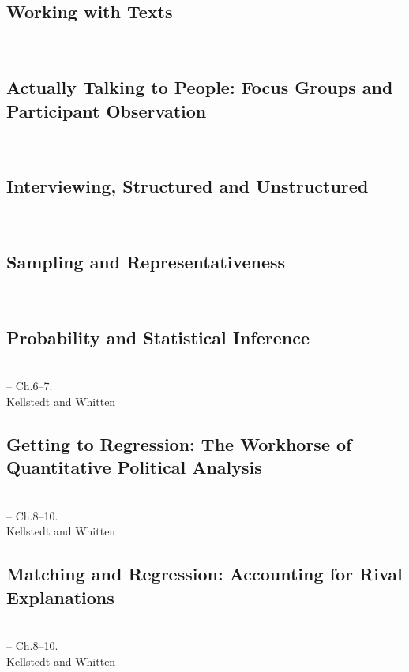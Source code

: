 \documentclass[12pt,a4paper]{article}
\newcommand{\lecture}[3][\DefaultOpt]{%
  \def\DefaultOpt{#2}%
  \clearpage\subsection[#1]{#2}\emph{#3}\vspace{.25em}\\
}
\newcommand{\reading}[2][]{\noindent -- {#1}\bibentry{#2}.\vspace{.25em}\\}
\newcommand{\textbook}[2][]{\noindent -- {#1}#2.\vspace{.25em}\\}
\begin{document}

\lecture{Working with Texts}{}

\lecture{Actually Talking to People: Focus Groups and Participant Observation}{}


\lecture{Interviewing, Structured and Unstructured}{}

\lecture{Sampling and Representativeness}{}

\lecture{Probability and Statistical Inference}{}
\textbook{Ch.6--7}{Kellstedt and Whitten}

\lecture{Getting to Regression: The Workhorse of Quantitative Political Analysis}{} 
\textbook{Ch.8--10}{Kellstedt and Whitten}

\lecture{Matching and Regression: Accounting for Rival Explanations}{}
\textbook{Ch.8--10}{Kellstedt and Whitten}
\end{document}
